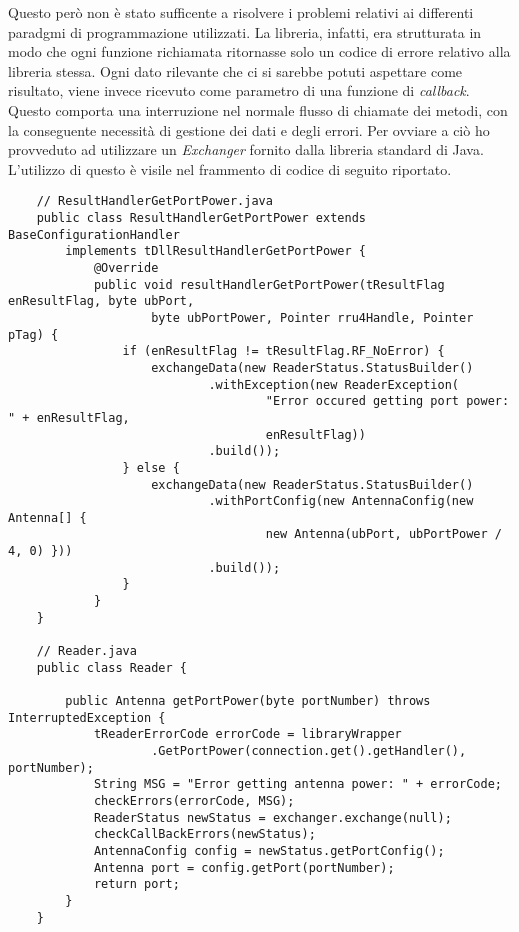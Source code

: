 \label{callback}
Questo però non è stato sufficente a risolvere i problemi relativi ai differenti paradgmi di programmazione utilizzati. La libreria, infatti, era strutturata
in modo che ogni funzione richiamata ritornasse solo un codice di errore relativo alla libreria stessa. Ogni dato rilevante che ci si sarebbe potuti
aspettare come risultato, viene invece ricevuto come parametro di una funzione di \emph{callback}. Questo comporta una interruzione nel normale flusso di
chiamate dei metodi, con la conseguente necessità di gestione dei dati e degli errori.
Per ovviare a ciò ho provveduto ad utilizzare un \emph{Exchanger} fornito dalla libreria standard di Java. 
L'utilizzo di questo è visile nel frammento di codice di seguito riportato.

\begin{lstlisting}
    // ResultHandlerGetPortPower.java
    public class ResultHandlerGetPortPower extends BaseConfigurationHandler 
        implements tDllResultHandlerGetPortPower {
            @Override
            public void resultHandlerGetPortPower(tResultFlag enResultFlag, byte ubPort,
                    byte ubPortPower, Pointer rru4Handle, Pointer pTag) {
                if (enResultFlag != tResultFlag.RF_NoError) {
                    exchangeData(new ReaderStatus.StatusBuilder()
                            .withException(new ReaderException(
                                    "Error occured getting port power: " + enResultFlag,
                                    enResultFlag))
                            .build());
                } else {
                    exchangeData(new ReaderStatus.StatusBuilder()
                            .withPortConfig(new AntennaConfig(new Antenna[] {
                                    new Antenna(ubPort, ubPortPower / 4, 0) }))
                            .build());
                }
            }
    }

    // Reader.java
    public class Reader {
        
        public Antenna getPortPower(byte portNumber) throws InterruptedException {
		    tReaderErrorCode errorCode = libraryWrapper
		            .GetPortPower(connection.get().getHandler(), portNumber);
		    String MSG = "Error getting antenna power: " + errorCode;
		    checkErrors(errorCode, MSG);
		    ReaderStatus newStatus = exchanger.exchange(null);
		    checkCallBackErrors(newStatus);
		    AntennaConfig config = newStatus.getPortConfig();
		    Antenna port = config.getPort(portNumber);
		    return port;
	    }
    }
\end{lstlisting}

